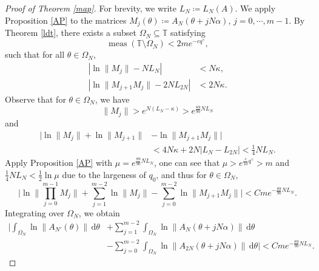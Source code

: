 \documentclass[reqno,12pt]{amsart}
\theoremstyle{plain}
\theoremstyle{definition}
\numberwithin{equation}{section}
\begin{document}
\begin{proof}[Proof of Theorem \ref{map}]
    For brevity, we write $L_{N} \coloneq L_{N}(A)$. We apply Proposition \ref{AP} to the matrices $M_{j}(\theta) \coloneq A_{N}(\theta + jN\alpha)$, $j=0,\cdots, m-1$. By Theorem \ref{ldt}, there exists a subset $\Omega_{N} \subseteq \mathbb{T}$ satisfying
    \begin{equation*}
        \operatorname{meas}(\mathbb{T} \setminus \Omega_{N}) < 2m e^{-cq^{\gamma}},
    \end{equation*}
    such that for all $\theta \in \Omega_{N}$,
    \begin{equation*}
        \begin{split}
            |\ln \|M_{j}\| - N L_{N}| &< N \kappa, \\
            |\ln \|M_{j+1}M_{j}\| - 2N L_{2N}| &< 2N\kappa.
        \end{split}
    \end{equation*}
    Observe that for $\theta \in \Omega_{N}$, we have
    \begin{equation*}
        \|M_{j}\| > e^{N(L_{N} - \kappa)} > e^{\frac{89}{90} N L_{N}}
    \end{equation*}
    and
    \begin{equation*}
        \begin{split}
            \big| \ln \|M_{j}\| + \ln \|M_{j+1}\| &- \ln \|M_{j+1}M_{j}\| \big| \\
            &< 4N\kappa + 2N |L_{N} - L_{2N}| < \frac{1}{4} N L_{N}.
        \end{split}
    \end{equation*}
    Apply Proposition \ref{AP} with $\mu=e^{\frac{89}{90} N L_{N}}$, one can see that $\mu>e^{\frac{c}{10}q^{\gamma}}>m$ and $\frac{1}{4}NL_{N}<\frac{1}{2}\ln \mu$ due to the largeness of $q_{0}$, and thus for $\theta \in \Omega_{N}$,
    \begin{equation*}
        \bigg| \ln \bigg\| \prod_{j=0}^{m-1} M_{j} \bigg\| + \sum_{j=1}^{m-2} \ln \|M_{j}\| - \sum_{j=0}^{m-2} \ln \|M_{j+1}M_{j}\| \bigg| < C m e^{-\frac{89}{90}NL_{N}}.
    \end{equation*}
    Integrating over $\Omega_{N}$, we obtain
    \begin{equation*}
        \begin{split}
            \bigg| \int_{\Omega_{N}} \ln \|A_{N'}(\theta)\| \,\mathrm{d}\theta &+ \sum_{j=1}^{m-2} \int_{\Omega_{N}} \ln \|A_{N}(\theta + jN\alpha)\| \,\mathrm{d}\theta \\ 
            &- \sum_{j=0}^{m-2} \int_{\Omega_{N}} \ln \|A_{2N}(\theta + jN\alpha)\| \,\mathrm{d}\theta \bigg| < C m e^{-\frac{89}{90}NL_{N}}.

\end{split}
\end{equation*}
\end{proof}
\end{document}

